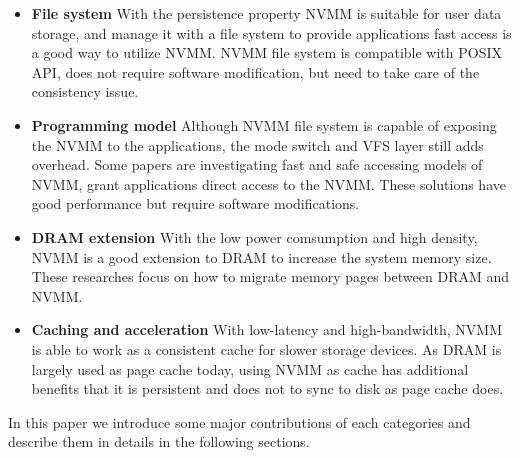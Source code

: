 \begin{itemize}
\item \textbf{File system} With the persistence property NVMM is suitable for
user data storage, and manage it with a file system to provide applications
fast access is a good way to utilize NVMM. NVMM file system is compatible
with POSIX API, does not require software modification, but need to take care
of the consistency issue.

\item \textbf{Programming model} Although NVMM file system is capable
 of exposing
the NVMM to the applications, the mode switch and VFS layer still adds
overhead. Some papers are investigating fast and safe accessing models of
NVMM, grant applications direct access to the NVMM. These solutions have
good performance but require software modifications.

\item \textbf{DRAM extension} With the low power comsumption and high density,
NVMM is a good extension to DRAM to increase the system memory size. These
researches focus on how to migrate memory pages between DRAM and NVMM.

\item \textbf{Caching and acceleration} With low-latency and high-bandwidth,
NVMM is able to work as a consistent cache for slower storage devices. As
DRAM is largely used as page cache today, using NVMM as cache has additional
benefits that it is persistent and does not to sync to disk as page cache
does.

\end{itemize}  

In this paper we introduce some major contributions of each categories
and describe them in details in the following sections.

